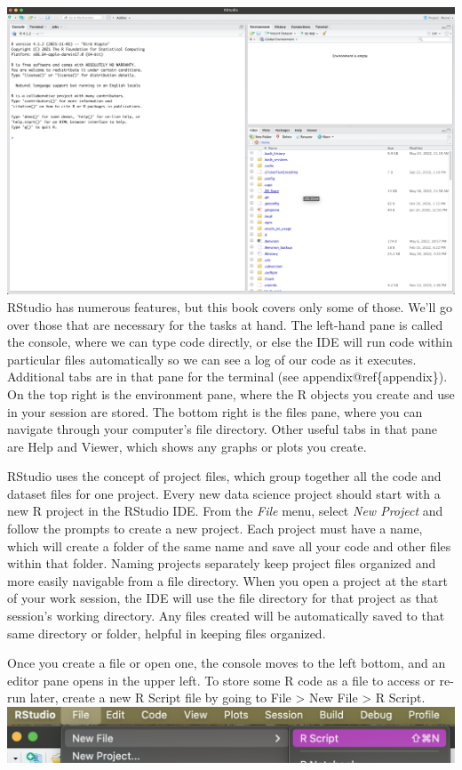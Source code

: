 \documentclass[
  krantz2]{krantz}
\begin{document}
\includegraphics{images/rstudio-landing-screen.png}
RStudio has numerous features, but this book covers only some of those. We'll go over those that are necessary for the tasks at hand. The left-hand pane is called the console, where we can type code directly, or else the IDE will run code within particular files automatically so we can see a log of our code as it executes. Additional tabs are in that pane for the terminal (see appendix@ref\{appendix\}). On the top right is the environment pane, where the R objects you create and use in your session are stored. The bottom right is the files pane, where you can navigate through your computer's file directory. Other useful tabs in that pane are Help and Viewer, which shows any graphs or plots you create.

RStudio uses the concept of project files, which group together all the code and dataset files for one project. Every new data science project should start with a new R project in the RStudio IDE. From the \emph{File} menu, select \emph{New Project} and follow the prompts to create a new project. Each project must have a name, which will create a folder of the same name and save all your code and other files within that folder. Naming projects separately keep project files organized and more easily navigable from a file directory. When you open a project at the start of your work session, the IDE will use the file directory for that project as that session's working directory. Any files created will be automatically saved to that same directory or folder, helpful in keeping files organized.

Once you create a file or open one, the console moves to the left bottom, and an editor pane opens in the upper left. To store some R code as a file to access or re-run later, create a new R Script file by going to File \textgreater{} New File \textgreater{} R Script.
\includegraphics{images/new-r-script.png}
\end{document}
